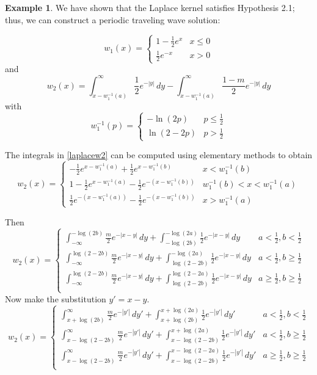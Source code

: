 \documentclass[11pt]{article}
\theoremstyle{definition}
\newtheorem{ex}[thm]{Example}
\numberwithin{equation}{section}
\numberwithin{thm}{section}
\newcommand{\winva}{{w_1^{-1}(a)}}
\begin{document}
\begin{ex}
We have shown that the Laplace kernel satisfies Hypothesis 2.1; thus, we can construct a periodic traveling wave solution:

\begin{equation}
w_1(x) =   \begin{cases} 
1 - \frac{1}{2}e^{x} & x \leq 0 \\
\frac{1}{2}e^{-x} & x > 0
\end{cases}
\end{equation}
and
\begin{equation}\label{laplacew2}
w_2(x) = \int_{x-\winva}^{\infty} \frac{1}{2} e^{-|y|} \,dy - \int_{x-\winva}^{\infty} \frac{1-m}{2} e^{-|y|} \,dy
\end{equation}
with
$$ w_1^{-1}(p) = \begin{cases} -\ln(2p) & p\leq \frac{1}{2} \\ \ln(2-2p) & p > \frac{1}{2} \end{cases} $$

The integrals in \eqref{laplacew2} can be computed using elementary methods to obtain
\begin{equation}
w_2(x) = \begin{cases}
-\frac{1}{2}e^{x-w_1^{-1}(a)} + \frac{1}{2}e^{x-w_1^{-1}(b)} & x < w_1^{-1}(b) \\
1 - \frac{1}{2} e^{x-w_1^{-1}(a)} - \frac{1}{2} e^{-(x-w_1^{-1}(b))} & w_1^{-1}(b) < x < w_1^{-1}(a) \\
\frac{1}{2} e^{-(x-w_1^{-1}(a))} - \frac{1}{2} e^{-(x-w_1^{-1}(b))} & x > w_1^{-1}(a)
\end{cases}
\end{equation}

Then
$$ w_2(x) = \begin{cases}
\int_{-\infty}^{-\log(2b)} \frac{m}{2}e^{-|x-y|}\,dy + \int_{-\log(2b)}^{-\log(2a)} \frac{1}{2}e^{-|x-y|} \,dy & a<\frac{1}{2}, b < \frac{1}{2} \\
\int_{-\infty}^{\log(2-2b)} \frac{m}{2}e^{-|x-y|} \,dy + \int_{\log(2-2b)}^{-\log(2a)} \frac{1}{2}e^{-|x-y|} \,dy & a<\frac{1}{2}, b \geq \frac{1}{2} \\ 
\int_{-\infty}^{\log(2-2b)} \frac{m}{2}e^{-|x-y|} \,dy + \int_{\log(2-2b)}^{\log(2-2a)} \frac{1}{2}e^{-|x-y|} \,dy & a\geq\frac{1}{2}, b \geq \frac{1}{2} \\
\end{cases} $$
Now make the substitution $y'=x-y$.
$$ w_2(x) = \begin{cases}
\int_{x+\log(2b)}^{\infty} \frac{m}{2}e^{-|y'|}\,dy' + \int_{x+\log(2b)}^{x+\log(2a)} \frac{1}{2}e^{-|y'|} \,dy' & a<\frac{1}{2}, b < \frac{1}{2} \\
\int_{x-\log(2-2b)}^{\infty} \frac{m}{2}e^{-|y'|} \,dy' + \int_{x-\log(2-2b)}^{x+\log(2a)} \frac{1}{2}e^{-|y'|} \,dy' & a<\frac{1}{2}, b \geq \frac{1}{2} \\ 
\int_{x-\log(2-2b)}^{\infty} \frac{m}{2}e^{-|y'|} \,dy' + \int_{x-\log(2-2b)}^{x-\log(2-2a)} \frac{1}{2}e^{-|y'|} \,dy' & a\geq\frac{1}{2}, b \geq \frac{1}{2} \\
\end{cases} $$


\end{ex}
\end{document}
